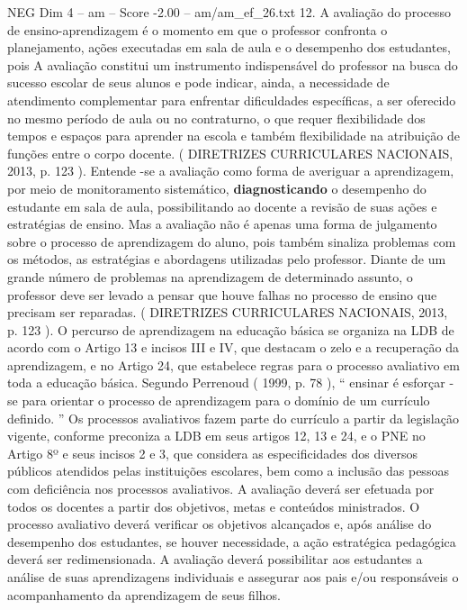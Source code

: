 \begin{textsample}{NEG Dim 4 – am – Score -2.00 – am/am\_ef\_26.txt}  \label{ex:f4_neg_182}
12.
A avaliação do processo de ensino-aprendizagem é o momento em que o professor confronta o planejamento, ações executadas em sala de aula e o desempenho dos estudantes, pois A avaliação constitui um instrumento indispensável do professor na busca do sucesso escolar de seus alunos e pode indicar, ainda, a necessidade de atendimento complementar para enfrentar dificuldades específicas, a ser oferecido no mesmo período de aula ou no contraturno, o que requer flexibilidade dos tempos e espaços para aprender na escola e também flexibilidade na atribuição de funções entre o corpo docente. ( DIRETRIZES CURRICULARES NACIONAIS, 2013, p. 123 ).
Entende -se a avaliação como forma de averiguar a aprendizagem, por meio de monitoramento sistemático, \textbf{diagnosticando} o desempenho do estudante em sala de aula, possibilitando ao docente a revisão de suas ações e estratégias de ensino.
Mas a avaliação não é apenas uma forma de julgamento sobre o processo de aprendizagem do aluno, pois também sinaliza problemas com os métodos, as estratégias e abordagens utilizadas pelo professor.
Diante de um grande número de problemas na aprendizagem de determinado assunto, o professor deve ser levado a pensar que houve falhas no processo de ensino que precisam ser reparadas. ( DIRETRIZES CURRICULARES NACIONAIS, 2013, p. 123 ).
O percurso de aprendizagem na educação básica se organiza na LDB de acordo com o Artigo 13 e incisos III e IV, que destacam o zelo e a recuperação da aprendizagem, e no Artigo 24, que estabelece regras para o processo avaliativo em toda a educação básica.
Segundo Perrenoud ( 1999, p. 78 ), “ ensinar é esforçar -se para orientar o processo de aprendizagem para o domínio de um currículo definido. ” Os processos avaliativos fazem parte do currículo a partir da legislação vigente, conforme preconiza a LDB em seus artigos 12, 13 e 24, e o PNE no Artigo 8º e seus incisos 2 e 3, que considera as especificidades dos diversos públicos atendidos pelas instituições escolares, bem como a inclusão das pessoas com deficiência nos processos avaliativos.
A avaliação deverá ser efetuada por todos os docentes a partir dos objetivos, metas e conteúdos ministrados.
O processo avaliativo deverá verificar os objetivos alcançados e, após análise do desempenho dos estudantes, se houver necessidade, a ação estratégica pedagógica deverá ser redimensionada.
A avaliação deverá possibilitar aos estudantes a análise de suas aprendizagens individuais e assegurar aos pais e/ou responsáveis o acompanhamento da aprendizagem de seus filhos.

\end{textsample}
